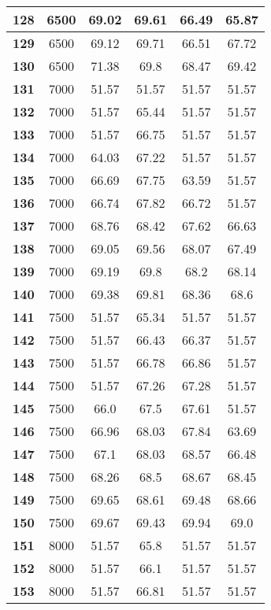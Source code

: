 \begin{longtable}{|c|c|c|c|c|c|}
\textbf{128} & 6500 & 69.02 & 69.61 & 66.49 & 65.87 \\ \hline 
\textbf{129} & 6500 & 69.12 & 69.71 & 66.51 & 67.72 \\ \hline 
\textbf{130} & 6500 & 71.38 & 69.8 & 68.47 & 69.42 \\ \hline 
\textbf{131} & 7000 & 51.57 & 51.57 & 51.57 & 51.57 \\ \hline 
\textbf{132} & 7000 & 51.57 & 65.44 & 51.57 & 51.57 \\ \hline 
\textbf{133} & 7000 & 51.57 & 66.75 & 51.57 & 51.57 \\ \hline 
\textbf{134} & 7000 & 64.03 & 67.22 & 51.57 & 51.57 \\ \hline 
\textbf{135} & 7000 & 66.69 & 67.75 & 63.59 & 51.57 \\ \hline 
\textbf{136} & 7000 & 66.74 & 67.82 & 66.72 & 51.57 \\ \hline 
\textbf{137} & 7000 & 68.76 & 68.42 & 67.62 & 66.63 \\ \hline 
\textbf{138} & 7000 & 69.05 & 69.56 & 68.07 & 67.49 \\ \hline 
\textbf{139} & 7000 & 69.19 & 69.8 & 68.2 & 68.14 \\ \hline 
\textbf{140} & 7000 & 69.38 & 69.81 & 68.36 & 68.6 \\ \hline 
\textbf{141} & 7500 & 51.57 & 65.34 & 51.57 & 51.57 \\ \hline 
\textbf{142} & 7500 & 51.57 & 66.43 & 66.37 & 51.57 \\ \hline 
\textbf{143} & 7500 & 51.57 & 66.78 & 66.86 & 51.57 \\ \hline 
\textbf{144} & 7500 & 51.57 & 67.26 & 67.28 & 51.57 \\ \hline 
\textbf{145} & 7500 & 66.0 & 67.5 & 67.61 & 51.57 \\ \hline 
\textbf{146} & 7500 & 66.96 & 68.03 & 67.84 & 63.69 \\ \hline 
\textbf{147} & 7500 & 67.1 & 68.03 & 68.57 & 66.48 \\ \hline 
\textbf{148} & 7500 & 68.26 & 68.5 & 68.67 & 68.45 \\ \hline 
\textbf{149} & 7500 & 69.65 & 68.61 & 69.48 & 68.66 \\ \hline 
\textbf{150} & 7500 & 69.67 & 69.43 & 69.94 & 69.0 \\ \hline 
\textbf{151} & 8000 & 51.57 & 65.8 & 51.57 & 51.57 \\ \hline 
\textbf{152} & 8000 & 51.57 & 66.1 & 51.57 & 51.57 \\ \hline 
\textbf{153} & 8000 & 51.57 & 66.81 & 51.57 & 51.57 \\ \hline 

\end{longtable}
